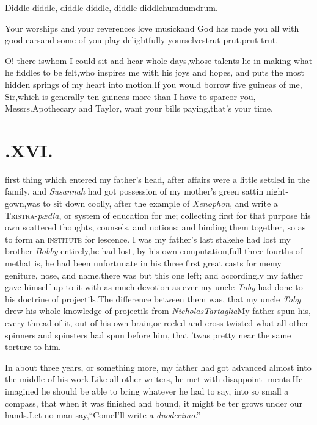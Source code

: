 \documentclass{article}
\begin{document}
Diddle diddle, diddle diddle, diddle\break
diddle\tsk hum\tsk dum\tsk drum.


\tsk Your worships and your reverences love musick\tsk and
God has made you all with good ears\tsk and some of you play
delightfully yourselves\tsk trut-prut,\tsk prut-trut.

O! there is\tsk whom I could sit and hear whole
days,\tsk whose talents lie in making what he fiddles to be
felt,\tsk who inspires me with his joys and hopes, and puts the
most hidden springs of my heart into\break
motion.\tsh If you would
borrow five guineas of me, Sir,\tsk which is generally ten
guineas more than I have to spare\tsk or you, Messrs.\@ Apothecary
and Taylor, want your bills paying,\tsk that’s your\break
time.

\section{.\enspace  XVI.}

\setlength{\baselineskip}{12.7826pt}%

 first thing which entered my\break
father’s head, after affairs were a\break
little settled in the family, and \textit{Susannah} had got possession of my mother’s
green sattin night-gown,\tsk was to sit down coolly, after the
example of \textit{Xenophon}, and write a
\textsc{Tristra}-\textit{pædia}, or system of education
for me; collecting first for that purpose his own scattered
thoughts, counsels, and notions; and binding them together, so as
to form an \textsc{institute} for  lescence. I was my father’s last
stake\tsk he had lost my brother \textit{Bobby} entirely,\tsk he
had lost, by his own computation,\break full three fourths of
me\tsk that is, he had been unfortunate in his three first great
casts for me\tsk my geniture, nose, and name,\tsk there was but
this one left; and accordingly my father gave himself up to it with
as much devotion as ever my uncle \textit{Toby} had done to his
doctrine of projectils.\tsk The difference between them was, that my uncle \textit{Toby} drew his whole
know\-ledge of projectils from \textit{Nicholas\break Tartaglia}\tsk My
father spun his, every thread of it, out of his own brain,\tsk or
reeled and cross-twisted what all other spinners and spinsters had
spun before him, that ’twas pretty near the same torture to
him.

\enlargethispage\baselineskip
In about three years, or something more, my father had got
advanced almost into the middle of his work.\tsk Like all other
writers, he met with disappoint- 
ments.\tsk He imagined he should be\break
able to bring whatever he had to say,\break
into so small a compass, that when it\break
was finished and bound, it might be\break
{}
ter grows under our hands.\tsk Let no man say,\tsk “Come\tsk I’ll write a \textit{duodecimo}.”
\end{document}
